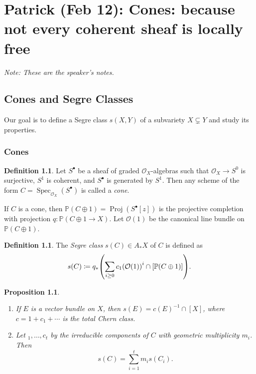 \documentclass[leqno, openany]{memoir}
\newtheorem{prop}[thm]{Proposition}
\theoremstyle{definition}
\newtheorem{defn}[thm]{Definition}
\theoremstyle{remark}
\theoremstyle{plain}
\theoremstyle{definition}
\theoremstyle{remark}
\renewcommand{\P}{\mathbb{P}}
\newcommand{\mc}[1]{\mathcal{#1}}
\DeclareMathOperator{\Spec}{Spec}
\DeclareMathOperator{\Proj}{Proj}
\begin{document}
\chapter{Patrick (Feb 12): Cones: because not every coherent sheaf is locally free}%
\label{cha:patrick_feb_12_}

\textit{Note: These are the speaker's notes.} 

\section{Cones and Segre Classes}%
\label{sec:cones_and_segre_classes}

Our goal is to define a Segre class $s(X,Y)$ of a subvariety $X \subsetneq Y$ and study its properties.

\subsection{Cones}%
\label{sub:cones}

\begin{defn}
    Let $S^{\bullet}$ be a sheaf of graded $\mc{O}_X$-algebras such that $\mc{O}_X \to S^0$ is surjective, $S^1$ is coherent, and $S^{\bullet}$ is generated by $S^1$. Then any scheme of the form $C = \Spec_{\mc{O}_X}(S^{\bullet})$ is called a \textit{cone}. 
\end{defn}

If $C$ is a cone, then $\P(C \oplus 1) = \Proj (S^{\bullet}[z])$ is the projective completion with projection $q \colon \P(C \oplus 1 \to X)$. Let $\mc{O}(1)$ be the canonical line bundle on $\P(C \oplus 1)$.

\begin{defn}
    The \textit{Segre class} $s(C) \in A_* X$ of $C$ is defined as
    \[ s(C) \coloneqq q_* \qty( \sum_{i \geq 0} {c_1(\mc{O}(1))}^i \cap [\P(C \oplus 1)] ). \]
\end{defn}

\begin{prop}\leavevmode
    \begin{enumerate}
        \item If $E$ is a vector bundle on $X$, then $s(E) = {c(E)}^{-1} \cap [X]$, where $c = 1 + c_1 + \cdots$ is the total Chern class.
        \item Let $_1, \ldots, c_t$ by the irreducible components of $C$ with geometric multiplicity $m_i$. Then
            \[ s(C) = \sum_{i = 1}^t m_i s(C_i). \]
    \end{enumerate}
\end{prop}
\end{document}

